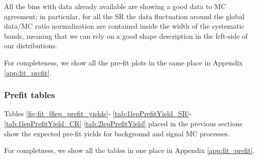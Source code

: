 All the bins with data already available are showing a good data to MC agreement; 
in particular, for all the SR the data fluctuation around the global data/MC ratio
normalization are contained inside the width of the systematic bands, 
meaning that we can rely on a good shape description in the left-side of our distributions.
 
For completeness, we show all the pre-fit plots in the same place in Appendix \ref{app:fit_prefit}.

\newcommand{\fitplotlocation}{./figures/StatisticalInterpretation/prefit/}

\clearpage
\subsubsection{Prefit tables}

Tables 
\ref{fig:fit_0lep_prefit_yields}-
\ref{tab:1lepPrefitYield_SR}-\ref{tab:1lepPrefitYield_CR}
\ref{tab:2lepPrefitYield}
placed in the previous sections show the expected pre-fit yields for background and signal MC processes.

For completness, we show all the tables in one place in Appendix \ref{app:fit_prefit}.

%









